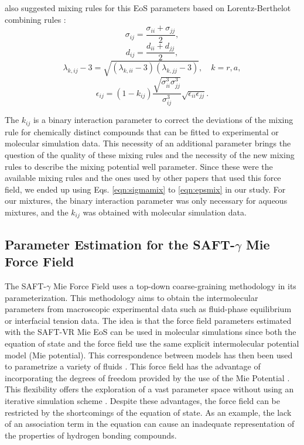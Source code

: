 	 also suggested mixing rules for this EoS parameters based on Lorentz-Berthelot combining rules \cite{rowlinson}:
	\begin{equation}
	\sigma_{ij} =\frac{\sigma_{ii}+\sigma_{jj}}{2},
	\label{eqn:sigmamix}
	\end{equation}
	\begin{equation}
	d_{ij} =\frac{d_{ii}+d_{jj}}{2},
	\label{eqn:dmix}
	\end{equation}
	\begin{equation}
	\lambda_{k,ij} -3 =\sqrt{(\lambda_{k,ii}-3)(\lambda_{k,jj}-3)},  \quad k=r,a,
	\label{eqn:lambdamix}
	\end{equation}
	\begin{equation}
	\epsilon_{ij} =(1-k_{ij})\frac{\sqrt{\sigma_{ii}^{3}\sigma_{jj}^{3}}}{\sigma_{ij}^{3}}\sqrt{\epsilon_{ii}\epsilon_{jj}}.
	\label{eqn:epsmix}
	\end{equation}
	
    The $k_{ij}$ is a binary interaction parameter to correct the deviations of the mixing rule for chemically distinct compounds that can be fitted to experimental or molecular simulation data. This necessity of an additional parameter brings the question of the quality of these mixing rules and the necessity of the new mixing rules to describe the mixing potential well parameter. Since these were the available mixing rules and the ones used by other papers that used this force field, we ended up using Eqs. \ref{eqn:sigmamix} to \ref{eqn:epsmix} in our study. For our mixtures, the binary interaction parameter was only necessary for aqueous mixtures, and the $k_{ij}$ was obtained with molecular simulation data.  
    
    
    \subsection{Parameter Estimation for the SAFT-$\gamma$ Mie Force Field}\label{parsaft}
    
    The SAFT-$\gamma$ Mie Force Field uses a top-down coarse-graining methodology in its parameterization. This methodology aims to obtain the intermolecular parameters from macroscopic experimental data such as fluid-phase equilibrium or interfacial tension data. The idea is that the force field parameters estimated with the SAFT-VR Mie EoS can be used in molecular simulations since both the equation of state and the force field use the same explicit intermolecular potential model (Mie potential). This correspondence between models has then been used to parametrize a variety of fluids \cite{ervik2016}. This force field has the advantage of incorporating the degrees of freedom provided by the use of the Mie Potential \cite{herdes2015}. This flexibility offers the exploration of a vast parameter space without using an iterative simulation scheme \cite{avendano2011}. Despite these advantages, the force field can be restricted by the shortcomings of the equation of state. As an example, the lack of an association term in the equation can cause an inadequate representation of the properties of hydrogen bonding compounds.
	

